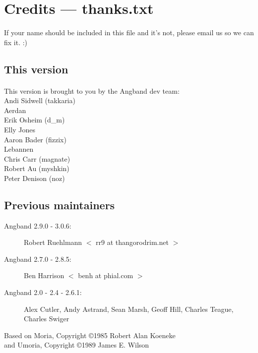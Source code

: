 \section{Credits --- thanks.txt}
\paragraph{}
If your name should be included in this file and it's not, please email us
so we can fix it. :)

\subsection{This version}
\paragraph{}
This version is brought to you by the Angband dev team: \vspace{1ex} \\
Andi Sidwell (takkaria) \\
Aerdan \\
Erik Osheim (d\_m) \\
Elly Jones \\
Aaron Bader (fizzix) \\
Lebannen \\
Chris Carr (magnate) \\
Robert Au (myshkin) \\
Peter Denison (noz)

\subsection{Previous maintainers}

\begin{description}
\item[Angband 2.9.0 - 3.0.6:]
Robert Ruehlmann $<$ rr9 at thangorodrim.net $>$

\item[Angband 2.7.0 - 2.8.5:]
Ben Harrison $<$ benh at phial.com $>$

\item[Angband 2.0 - 2.4 - 2.6.1:]
Alex Cutler, Andy Astrand, Sean Marsh,
Geoff Hill, Charles Teague, Charles Swiger

\end{description}

\noindent
Based on Moria, Copyright \copyright 1985 Robert Alan Koeneke \\
and Umoria, Copyright \copyright 1989 James E. Wilson

